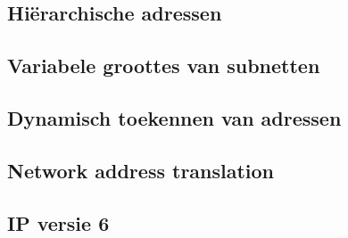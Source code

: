 \subsection{Hiërarchische adressen}

\begin{frame}
\end{frame}

\subsection{Variabele groottes van subnetten}

\begin{frame}
\end{frame}

\subsection{Dynamisch toekennen van adressen}

\begin{frame}
\end{frame}

\subsection{Network address translation}

\begin{frame}
\end{frame}

\subsection{IP versie 6}

\begin{frame}
\end{frame}

